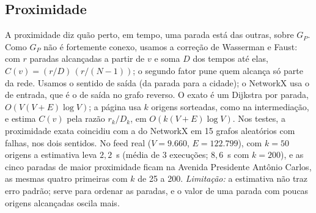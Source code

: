 \subsection{Proximidade}\label{sec:F-MET-2}

A proximidade diz quão perto, em tempo, uma parada está das outras, sobre $G_P$. Como $G_P$
não é fortemente conexo, usamos a correção de Wasserman e Faust: com $r$ paradas alcançadas
a partir de $v$ e soma $D$ dos tempos até elas, $C(v) = (r/D)\,(r/(N-1))$; o segundo fator
pune quem alcança só parte da rede. Usamos o sentido de saída (da parada para a cidade); o
NetworkX usa o de entrada, que é o de saída no grafo reverso. O exato é um Dijkstra por
parada, $O(V(V+E)\log V)$; a página usa $k$ origens sorteadas, como na intermediação, e
estima $C(v)$ pela razão $r_k/D_k$, em $O(k(V+E)\log V)$. Nos testes, a proximidade exata
coincidiu com a do NetworkX em 15 grafos aleatórios com falhas, nos dois sentidos. No feed
real ($V = 9{.}660$, $E = 122{.}799$), com $k = 50$ origens a estimativa leva $2{,}2$~s
(média de 3 execuções; $8{,}6$~s com $k = 200$), e as cinco paradas de maior proximidade ficam na
Avenida Presidente Antônio Carlos, as mesmas quatro primeiras com $k$ de 25 a 200.
\emph{Limitação:} a estimativa não traz erro padrão; serve para ordenar as paradas, e o
valor de uma parada com poucas origens alcançadas oscila mais.
